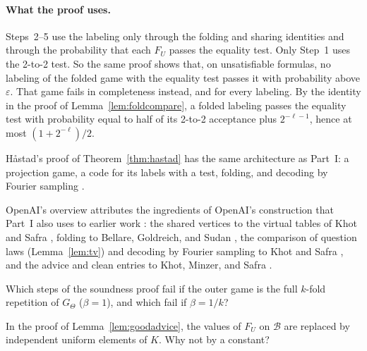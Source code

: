 \paragraph{What the proof uses.} Steps~2--5 use the labeling only through the folding and sharing identities and through the probability that each $F_U$ passes the equality test. Only Step~1 uses the 2-to-2 test. So the same proof shows that, on unsatisfiable formulas, no labeling of the folded game with the equality test passes it with probability above $\varepsilon$. That game fails in completeness instead, and for every labeling. By the identity in the proof of Lemma~\ref{lem:foldcompare}, a folded labeling passes the equality test with probability equal to half of its 2-to-2 acceptance plus $2^{-\ell-1}$, hence at most $(1+2^{-\ell})/2$.

H\aa stad's proof of Theorem~\ref{thm:hastad} has the same architecture as Part~I: a projection game, a code for its labels with a test, folding, and decoding by Fourier sampling \cite[Section~22.7]{AB09}.

\chapternotes
OpenAI's overview attributes the ingredients of OpenAI's construction that Part~I also uses to earlier work \cite[Section~1.4]{OAI}: the shared vertices to the virtual tables of Khot and Safra \cite[Section~1.1]{KS13}, folding to Bellare, Goldreich, and Sudan \cite[Section~3.3]{BGS98}, the comparison of question laws (Lemma~\ref{lem:tv}) and decoding by Fourier sampling to Khot and Safra \cite{KS13}, and the advice and clean entries to Khot, Minzer, and Safra \cite{KMS17}.

\chapterquestions
\begin{question}\label{q:beta}
Which steps of the soundness proof fail if the outer game is the full $k$-fold repetition of $G_\Theta$ ($\beta=1$), and which fail if $\beta=1/k$?
\end{question}

\begin{question}\label{q:erasure}
In the proof of Lemma~\ref{lem:goodadvice}, the values of $F_U$ on $\mathcal B$ are replaced by independent uniform elements of $K$. Why not by a constant?
\end{question}

